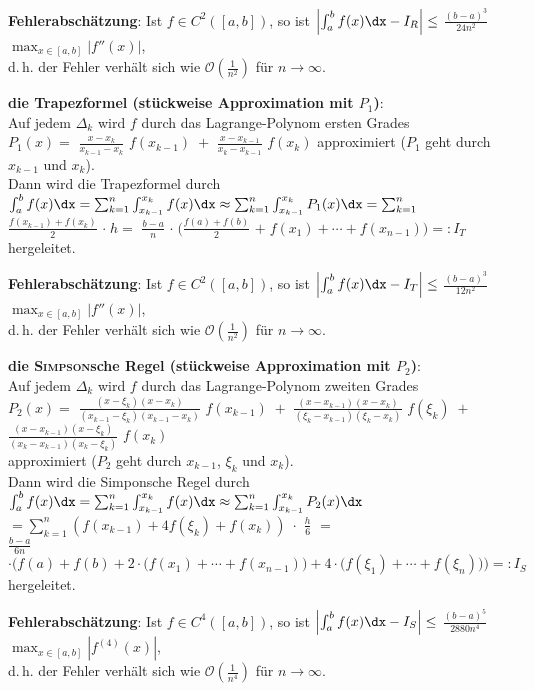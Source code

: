 \textbf{Fehlerabschätzung}: Ist $f \in C^2([a,b])$, so ist
$\left|\int_a^b f(x)\dx - I_R\right| \le$
{\large $\frac{(b - a)^3}{24n^2}$}
$\max_{x \in [a,b]} |f''(x)|$, \\
d.\,h. der Fehler verhält sich wie $\mathcal{O}(\frac{1}{n^2})$ für
$n \to \infty$.

\linie

\textbf{die Trapezformel (stückweise Approximation mit $P_1$)}: \\
Auf jedem $\Delta_k$ wird $f$ durch das Lagrange-Polynom ersten Grades \\
$P_1(x) =$ {\large $\frac{x - x_k}{x_{k-1} - x_k}$} $f(x_{k-1}) \;+$
{\large $\frac{x - x_{k-1}}{x_k - x_{k-1}}$} $f(x_k)$ approximiert
($P_1$ geht durch $x_{k-1}$ und $x_k$). \\
Dann wird die Trapezformel durch
$\int_a^b f(x)\dx = \sum_{k=1}^n \int_{x_{k-1}}^{x_k} f(x)\dx
\approx \sum_{k=1}^n \int_{x_{k-1}}^{x_k} P_1(x)\dx
= \sum_{k=1}^n$ {\large $\frac{f(x_{k-1}) + f(x_k)}{2}$} $\cdot\; h
=$ {\large $\frac{b - a}{n}$} $\cdot\; \Big(${\large $\frac{f(a) + f(b)}{2}$}
$+\; f(x_1) + \cdots + f(x_{n-1})\Big) =: I_T$ hergeleitet.

\textbf{Fehlerabschätzung}: Ist $f \in C^2([a,b])$, so ist
$\left|\int_a^b f(x)\dx - I_T\right| \le$
{\large $\frac{(b - a)^3}{12n^2}$}
$\max_{x \in [a,b]} |f''(x)|$, \\
d.\,h. der Fehler verhält sich wie $\mathcal{O}(\frac{1}{n^2})$ für
$n \to \infty$.

\linie

\textbf{die \textsc{Simpson}sche Regel (stückweise Approximation mit $P_2$)}:
\\
Auf jedem $\Delta_k$ wird $f$ durch das Lagrange-Polynom zweiten Grades \\
$P_2(x) =$ {\large $\frac{(x - \xi_k)(x - x_k)}
{(x_{k-1} - \xi_k)(x_{k-1} - x_k)}$} $f(x_{k-1}) \;+$
{\large $\frac{(x - x_{k-1})(x - x_k)}
{(\xi_k - x_{k-1})(\xi_k - x_k)}$} $f(\xi_k) \;+$
{\large $\frac{(x - x_{k-1})(x - \xi_k)}
{(x_k - x_{k-1})(x_k - \xi_k)}$} $f(x_k)$ \\ 
approximiert ($P_2$ geht durch $x_{k-1}$, $\xi_k$ und $x_k$). \\
Dann wird die Simponsche Regel durch
$\int_a^b f(x)\dx = \sum_{k=1}^n \int_{x_{k-1}}^{x_k} f(x)\dx
\approx \sum_{k=1}^n \int_{x_{k-1}}^{x_k} P_2(x)\dx$\\
$= \sum_{k=1}^n (f(x_{k-1}) + 4f(\xi_k) + f(x_k)) \;\cdot$
{\large $\frac{h}{6}$} $=$ \\
{\large $\frac{b - a}{6n}$} $\cdot \Big(f(a) + f(b) +
2 \cdot \big(f(x_1) + \cdots + f(x_{n-1})\big) +
4 \cdot \big(f(\xi_1) + \cdots + f(\xi_n)\big)\Big) =: I_S$ hergeleitet.

\textbf{Fehlerabschätzung}: Ist $f \in C^4([a,b])$, so ist
$\left|\int_a^b f(x)\dx - I_S\right| \le$
{\large $\frac{(b - a)^5}{2880n^4}$}
$\max_{x \in [a,b]} |f^{(4)}(x)|$, \\
d.\,h. der Fehler verhält sich wie $\mathcal{O}(\frac{1}{n^4})$ für
$n \to \infty$.

\pagebreak
